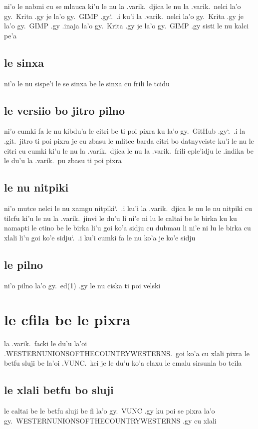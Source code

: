 \documentclass{report}
\newcommand\sds{\spacefactor\sfcode`.\ \space}
\begin{document}
ni'o le nabmi cu se mlauca ki'u le nu la .varik.\ djica le nu la .varik.\ nelci la'o gy.\ Krita .gy je la'o gy.\ GIMP .gy.\sds  .i ku'i la .varik.\ nelci la'o gy.\ Krita .gy je la'o gy.\ GIMP .gy .inaja la'o gy.\ Krita .gy je la'o gy.\ GIMP .gy sisti le nu kalci pe'a

\subsection{le sinxa}
ni'o le nu sispe'i le se sinxa be le sinxa cu frili le tcidu

\subsection{le versiio bo jitro pilno}
ni'o cumki fa le nu kibdu'a le citri be ti poi pixra ku la'o gy.\ GitHub .gy\sds  .i la .git.\ jitro ti poi pixra je cu zbasu le mlitce barda citri bo datnyveiste
ku'i le nu le citri cu cumki ki'u le nu la .varik.\ djica le nu la .varik.\ frili cple'idju le .indika be le du'u la .varik.\ pu zbasu ti poi pixra

\subsection{le nu nitpiki}
ni'o mutce nelci le nu xamgu nitpiki\sds  .i ku'i la .varik.\ djica le nu le nu nitpiki cu tilcfu ki'u le nu la .varik.\ jinvi le du'u li ni'e ni lu le caltai be le birka ku ku namapti le ctino be le birka li'u goi ko'a sidju cu dubmau li ni'e ni lu le birka cu xlali li'u goi ko'e sidju\sds  .i ku'i cumki fa le nu ko'a je ko'e sidju

\subsection{le pilno}
ni'o pilno la'o gy.\ ed(1) .gy le nu ciska ti poi velski

\section{le cfila be le pixra}
la .varik.\ facki le du'u la'oi .WESTERNUNIONSOFTHECOUNTRYWESTERNS.\ goi ko'a cu xlali pixra le betfu sluji be la'oi .VUNC.\ kei je le du'u ko'a claxu le cmalu sirsunla bo tcila

\subsection{le xlali betfu bo sluji}
le caltai be le betfu sluji be fi la'o gy.\ VUNC .gy ku poi se pixra la'o gy.\ WESTERNUNIONSOFTHECOUNTRYWESTERNS .gy cu xlali
\end{document}
